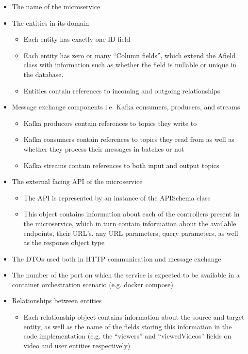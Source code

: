 \documentclass[parskip=full]{article}
\begin{document}
    \begin{itemize}
        \item	The name of the microservice
        \item	The entities in its domain
        \begin{itemize}
            \item Each entity has exactly one ID field
            \item Each entity has zero or many ``Column fields'', which extend the Afield class with information such as whether the field is nullable or unique in the database.
            \item Entities contain references to incoming and outgoing relationships
        \end{itemize}
        \item	Message exchange components i.e. Kafka consumers, producers, and streams
        \begin{itemize}
            \item Kafka producers contain references to topics they write to
            \item Kafka consumers contain references to topics they read from as well as whether they process their messages in batches or not
            \item Kafka streams contain references to both input and output topics
        \end{itemize}
        \item	The external facing API of the microservice
        \begin{itemize}
            \item The API is represented by an instance of the APISchema class
            \item This object contains information about each of the controllers present in the microservice, which in turn contain information about the available endpoints, their URL's, any URL parameters, query parameters, as well as the response object type
        \end{itemize}
        \item	The DTOs used both in HTTP communication and message exchange
        \item	The number of the port on which the service is expected to be available in a container orchestration scenario (e.g. docker compose)
        \item	Relationships between entities
        \begin{itemize}
            \item Each relationship object contains information about the source and target entity, as well as the name of the fields storing this information in the code implementation (e.g. the  ``viewers'' and  ``viewedVideos'' fields on video and user entities respectively)

\end{itemize}
\end{itemize}
\end{document}
